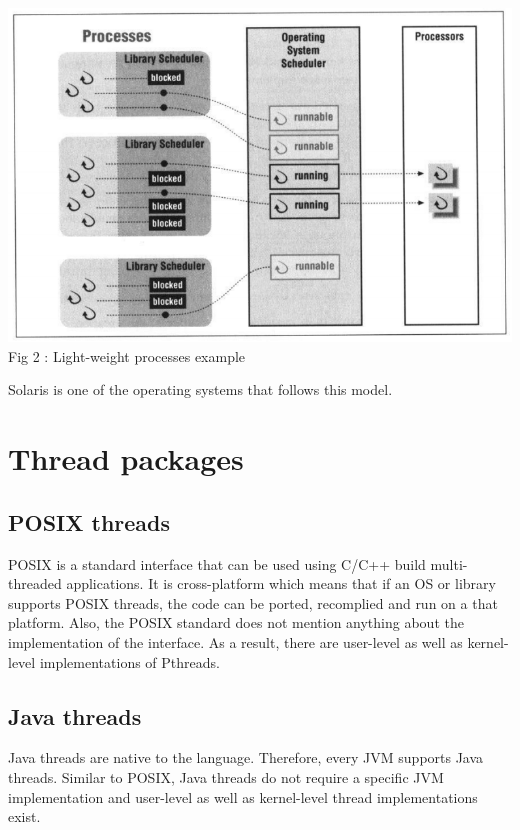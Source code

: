 \documentclass[twoside]{article}
\begin{document}
\begin{center}
  \includegraphics[scale=0.6]{light_weight_processes.png}\\
  Fig 2 : Light-weight processes example
\end{center} 

Solaris is one of the operating systems that follows this model.


\section{Thread packages}

\subsection{POSIX threads}
POSIX is a standard interface that can be used using C/C++ build multi-threaded applications. It is cross-platform which means that if an OS or library supports POSIX threads, the code can be ported, recomplied and run on a that platform. Also, the POSIX standard does not mention anything about the implementation of the interface. As a result, there are user-level as well as kernel-level implementations of Pthreads. 

\subsection{Java threads}
Java threads are native to the language. Therefore, every JVM supports Java threads. Similar to POSIX, Java threads do not require a specific JVM implementation and user-level as well as kernel-level thread implementations exist.
\end{document}
